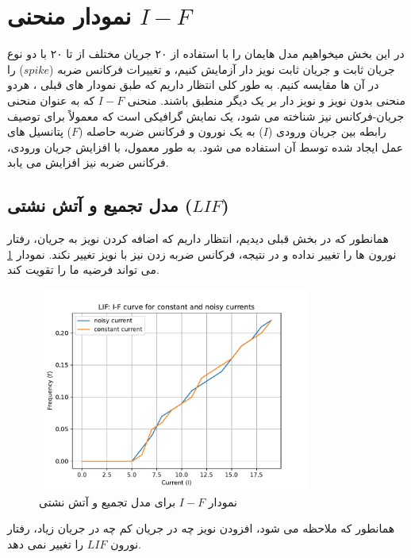 \documentclass{article}
\begin{document}
    \section{نمودار منحنی $I-F$}
        در این بخش میخواهیم مدل هایمان را با استفاده از ۲۰ جریان مختلف از  تا ۲۰ با دو نوع جریان ثابت و جریان ثابت نویز دار آزمایش کنیم، و تغییرات فرکانس ضربه
        ($spike$) 
        را در آن ها مقایسه کنیم. به طور کلی انتظار داریم که طبق نمودار های قبلی ، هردو منحنی بدون نویز و نویز دار بر یک دیگر منطبق باشند.
        منحنی 
        $I-F$ 
        که به عنوان منحنی جریان-فرکانس نیز شناخته می شود، یک نمایش گرافیکی است که معمولاً برای توصیف رابطه بین جریان ورودی 
        ($I$) 
        به یک نورون و فرکانس ضربه حاصله 
        ($F$)
        پتانسیل های عمل ایجاد شده توسط آن استفاده می شود. به طور معمول، با افزایش جریان ورودی، فرکانس ضربه نیز افزایش می یابد. 
        
        \subsection{مدل تجمیع و آتش نشتی ($LIF$)}
            همانطور که در بخش قبلی دیدیم، انتظار داریم که اضافه کردن نویز به جریان، رفتار نورون ها را تغییر نداده و در نتیجه، فرکانس ضربه زدن نیز با نویز تغییر نکند. نمودار 
            \ref{fig:lif-noise-curr-I-F}
            می تواند فرضیه ما را تقویت کند.
            \begin{figure}[H]
                \centering
                \includegraphics[width=0.8\textwidth]{plots/LIF: I-F curve for constant and noisy currents.pdf} 
                \caption{نمودار $I-F$ برای مدل تجمیع و آتش نشتی  }
                \label{fig:lif-noise-curr-I-F}
            \end{figure}
            همانطور که ملاحظه می شود، افزودن نویز چه در جریان کم چه در جریان زیاد، رفتار نورون $LIF$ را تغییر نمی دهد.
\end{document}
